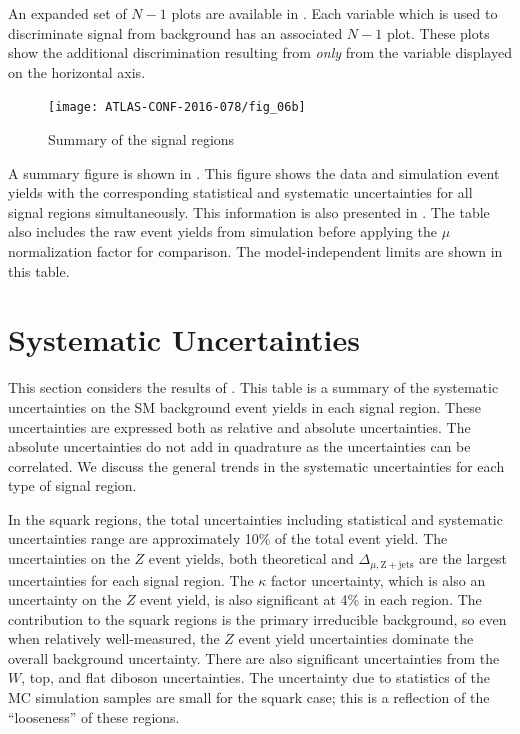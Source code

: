 An expanded set of $N-1$ plots are available in .
Each variable which is used to discriminate signal from background has an associated $N-1$ plot.
These plots show the additional discrimination resulting from \textit{only} from the variable displayed on the horizontal axis.

\begin{figure}[tbp]
\centering
\caption{Summary of the signal regions} \label{fig:sr_summary}
\texttt{[image: ATLAS-CONF-2016-078/fig\_06b]}
\end{figure}
A summary figure is shown in .
This figure shows the data and simulation event yields with the corresponding statistical and systematic uncertainties for all signal regions simultaneously.
This information is also presented in .
The table also includes the raw event yields from simulation before applying the $\mu$ normalization factor for comparison.
The model-independent limits are shown in this table.


\section{Systematic Uncertainties}

This section considers the results of .
This table is a summary of the systematic uncertainties on the SM background event yields in each signal region.
These uncertainties are expressed both as relative and absolute uncertainties.
The absolute uncertainties do not add in quadrature as the uncertainties can be correlated.
We discuss the general trends in the systematic uncertainties for each type of signal region.

In the squark regions, the total uncertainties including statistical and systematic uncertainties range are approximately 10\% of the total event yield.
The uncertainties on the $Z$ event yields, both theoretical and $\Delta_{\mu,\mathrm{Z+jets}}$ are the largest uncertainties for each signal region.
The $\kappa$ factor uncertainty, which is also an uncertainty on the $Z$ event yield, is also significant at 4\% in each region.
The \Zvv contribution to the squark regions is the primary irreducible background, so even when relatively well-measured, the $Z$ event yield uncertainties dominate the overall background uncertainty.
There are also significant uncertainties from the $W$, top, and flat diboson uncertainties.
The uncertainty due to statistics of the MC simulation samples are small for the squark case; this is a reflection of the ``looseness'' of these regions.


